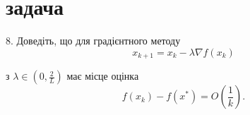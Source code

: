 \section{задача}
\begin{tcolorbox}[title=Умова]
8. Доведіть, що для градієнтного методу
$$
x_{k+1}=x_k-\lambda \nabla f\left(x_k\right)
$$

з $\lambda \in\left(0, \frac{2}{L}\right)$ має місце оцінка
$$
f\left(x_k\right)-f\left(x^*\right)=O\left(\frac{1}{k}\right) .
$$
\end{tcolorbox}
